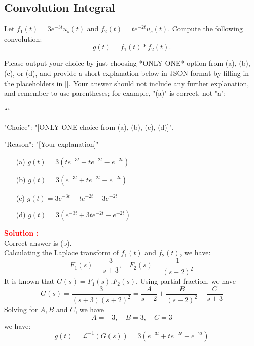 \documentclass[12pt]{article}
\begin{document}
\clearpage
\subsection{Convolution Integral}

Let $f_1(t)=3e^{-3t}u_s(t)$ and $f_2(t) = te^{-2t}u_s(t)$. Compute the following convolution:
\begin{equation*}
    g(t) = f_1(t)*f_2(t).
\end{equation*}

Please output your choice by just choosing *ONLY ONE* option from (a), (b), (c), or (d), and provide a short explanation below in JSON format by filling in the placeholders in []. Your answer should not include any further explanation, and remember to use parentheses; for example, "(a)" is correct, not "a":

```
{

"Choice": "[ONLY ONE choice from (a), (b), (c), (d)]",

"Reason": "[Your explanation]"

}

\begin{itemize}
    \item[(a)] \(g(t) = 3(te^{-3t} + te^{-2t}-e^{-2t})\)
    \item[(b)] \(g(t) = 3(e^{-3t} + te^{-2t}-e^{-2t})\)
    \item[(c)] \(g(t) = 3e^{-3t} + te^{-2t}-3e^{-2t}\)
    \item[(d)] \(g(t) = 3(e^{-3t} + 3te^{-2t}-e^{-2t})\)
\end{itemize}



\textbf{\textcolor{red}{Solution :}} \\
Correct answer is (b).\\
Calculating the Laplace transform of \(f_1(t)\) and \(f_2(t)\), we have:
\begin{equation}
    F_1(s) = \frac{3}{s+3}, \quad F_2(s) = \frac{1}{(s+2)^2}
\end{equation}
It is known that \(G(s) = F_1(s).F_2(s)\). Using partial fraction, we have
\begin{equation}
    G(s) = \frac{3}{(s+3)(s+2)^2} = \frac{A}{s+2} + \frac{B}{(s+2)^2} + \frac{C}{s+3}
\end{equation}
Solving for \(A,B\) and \(C\), we have
\begin{equation}
    A = -3, \quad B = 3, \quad C= 3
\end{equation}
we have:
\begin{equation}
    g(t) = \mathcal{L}^{-1}(G(s)) = 3(e^{-3t} + te^{-2t}-e^{-2t})
\end{equation}
\end{document}
